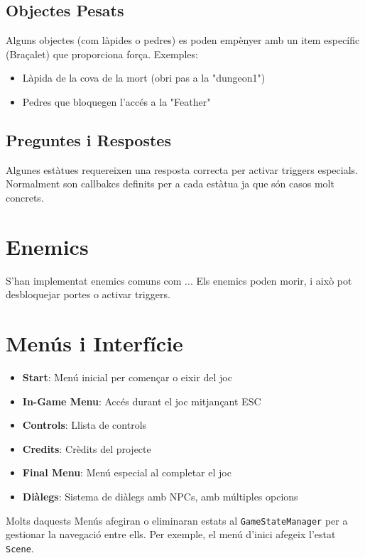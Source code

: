 \documentclass[a4paper,12pt]{article}
\begin{document}
\subsection{Objectes Pesats}
Alguns objectes (com làpides o pedres) es poden empènyer amb un item específic (Braçalet) que proporciona força. Exemples:
\begin{itemize}
    \item Làpida de la cova de la mort (obri pas a la "dungeon1")
    \item Pedres que bloquegen l'accés a la "Feather"
\end{itemize}

\subsection{Preguntes i Respostes}
Algunes estàtues requereixen una resposta correcta per activar triggers especials.
Normalment son callbakcs definits per a cada estàtua ja que són casos molt concrets.

\section{Enemics}
S'han implementat enemics comuns com ... Els enemics poden morir, i això pot desbloquejar portes o activar triggers.

\section{Menús i Interfície}

\begin{itemize}
    \item \textbf{Start}: Menú inicial per començar o eixir del joc
    \item \textbf{In-Game Menu}: Accés durant el joc mitjançant ESC
    \item \textbf{Controls}: Llista de controls
    \item \textbf{Credits}: Crèdits del projecte
    \item \textbf{Final Menu}: Menú especial al completar el joc
    \item \textbf{Diàlegs}: Sistema de diàlegs amb NPCs, amb múltiples opcions
\end{itemize}

Molts daquests Menús afegiran o eliminaran estats al \texttt{GameStateManager} per a gestionar la navegació entre ells. Per exemple, el menú d'inici afegeix l'estat \texttt{Scene}. 
\end{document}
